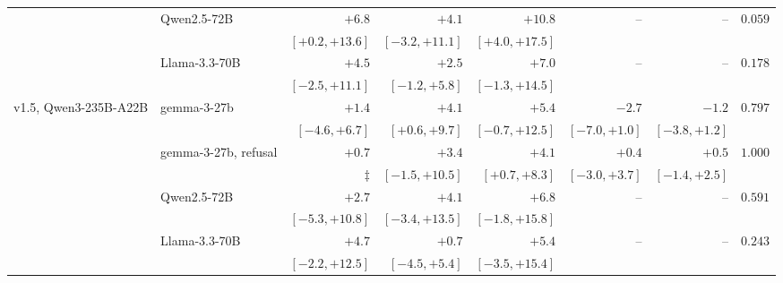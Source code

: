 \documentclass{article}
\begin{document}
\begin{table}[htbp]
{\begin{tabular}{llrrrrrr}
 & Qwen2.5-72B & $+6.8$ & $+4.1$ & $+10.8$ & -- & -- & $0.059$\\
 & & {\scriptsize$[+0.2,+13.6]$} & {\scriptsize$[-3.2,+11.1]$} & {\scriptsize$[+4.0,+17.5]$} &  &  & \\
 & Llama-3.3-70B & $+4.5$ & $+2.5$ & $+7.0$ & -- & -- & $0.178$\\
 & & {\scriptsize$[-2.5,+11.1]$} & {\scriptsize$[-1.2,+5.8]$} & {\scriptsize$[-1.3,+14.5]$} &  &  & \\
v1.5, Qwen3-235B-A22B & gemma-3-27b & $+1.4$ & $+4.1$ & $+5.4$ & $-2.7$ & $-1.2$ & $0.797$\\
 & & {\scriptsize$[-4.6,+6.7]$} & {\scriptsize$[+0.6,+9.7]$} & {\scriptsize$[-0.7,+12.5]$} & {\scriptsize$[-7.0,+1.0]$} & {\scriptsize$[-3.8,+1.2]$} & \\
 & gemma-3-27b, refusal & $+0.7$ & $+3.4$ & $+4.1$ & $+0.4$ & $+0.5$ & $1.000$\\
 & & {\scriptsize$\ddagger$} & {\scriptsize$[-1.5,+10.5]$} & {\scriptsize$[+0.7,+8.3]$} & {\scriptsize$[-3.0,+3.7]$} & {\scriptsize$[-1.4,+2.5]$} & \\
 & Qwen2.5-72B & $+2.7$ & $+4.1$ & $+6.8$ & -- & -- & $0.591$\\
 & & {\scriptsize$[-5.3,+10.8]$} & {\scriptsize$[-3.4,+13.5]$} & {\scriptsize$[-1.8,+15.8]$} &  &  & \\
 & Llama-3.3-70B & $+4.7$ & $+0.7$ & $+5.4$ & -- & -- & $0.243$\\
 & & {\scriptsize$[-2.2,+12.5]$} & {\scriptsize$[-4.5,+5.4]$} & {\scriptsize$[-3.5,+15.4]$} &  &  & \\
\bottomrule
\end{tabular}}
\end{table}
\end{document}
